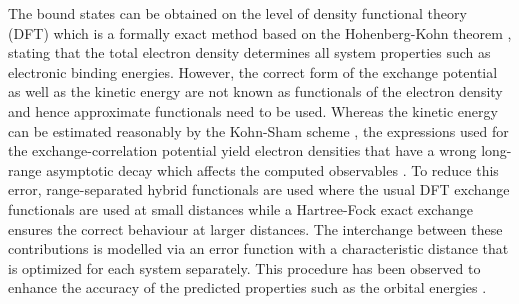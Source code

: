 The bound states can be obtained on the level of density functional theory (DFT) which is a formally exact method based on the Hohenberg-Kohn theorem \cite{HohenbergKohn}, stating that the total electron density determines all system properties such as electronic binding energies.
However, the correct form of the exchange potential as well as the kinetic energy are not known as functionals of the electron density and hence approximate functionals need to be used.
Whereas the kinetic energy can be estimated reasonably by the Kohn-Sham scheme \cite{KohnSham}, the expressions used for the exchange-correlation potential yield electron densities that have a wrong long-range asymptotic decay which affects the computed observables \cite{Koerzd1, Koerzd2, Bokareva}.
To reduce this error, range-separated hybrid functionals are used where the usual DFT exchange functionals are used at small distances while a Hartree-Fock exact exchange ensures the correct behaviour at larger distances.
The interchange between these contributions is modelled via an error function with a characteristic distance that is optimized for each system separately.
This procedure has been observed to enhance the accuracy of the predicted properties such as the orbital energies \cite{Bokareva,GrellKuehn, Gerber, Gerber2}.

